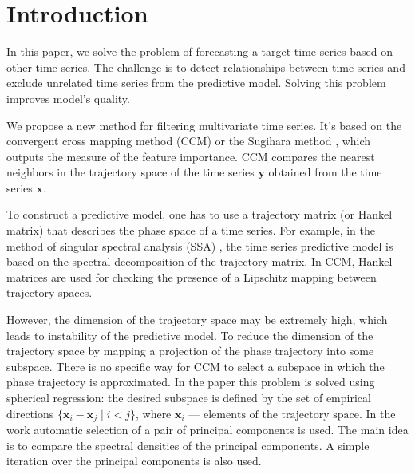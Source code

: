 \documentclass[bst/sn-mathphys]{sn-jnl}%
\newcommand{\bx}{\ensuremath{\mathbf{x}}}
\newcommand{\by}{\mathbf{y}}
\theoremstyle{thmstyleone}%
\theoremstyle{thmstyletwo}%
\theoremstyle{thmstylethree}%
\begin{document}
\section{Introduction}

In this paper, we solve the problem of forecasting a target time series based on other time series.
The challenge is to detect relationships between time series and exclude unrelated time series from the predictive model.
Solving this problem improves model's quality.

We propose a new method for filtering multivariate time series. 
It's based on the convergent cross mapping method (CCM) or the Sugihara method \cite{Sugihara90, sugihara1990nonlinear},
which outputs the measure of the feature importance.
CCM compares the nearest neighbors in the trajectory space of the time series $\by$ obtained from the time series $\bx$.

To construct a predictive model, one has to use a trajectory matrix (or Hankel matrix) that describes the phase space of a time series.
For example, in the method of singular spectral analysis (SSA) \cite {golyandina2005ssa, golyandina2001analysis, zhigljavsky2010singular, ignatov2016har}, the time series predictive model is based on the spectral decomposition of the trajectory matrix.
In CCM, Hankel matrices are used for checking the presence of a Lipschitz mapping between trajectory spaces.

However, the dimension of the trajectory space may be extremely high, 
which leads to instability of the predictive model.
To reduce the dimension of the trajectory space by mapping a projection of the phase trajectory into some subspace. 
There is no specific way for CCM to select a subspace in which the phase trajectory is approximated.
In the paper \cite{usmanova2020sphere_regr} this problem is solved using spherical regression: the desired subspace is defined by the set of empirical directions $\{ \bx_i - \bx_j \mid i < j \}$, where $\bx_i \text{~--- elements of the trajectory space}$. 
In the work \cite{alexandrov2005automatic} automatic selection of a pair of principal components is used.
The main idea is to compare the spectral densities of the principal components. 
A simple iteration over the principal components \cite{usmanova2019dependencies} is also used.
\end{document}
